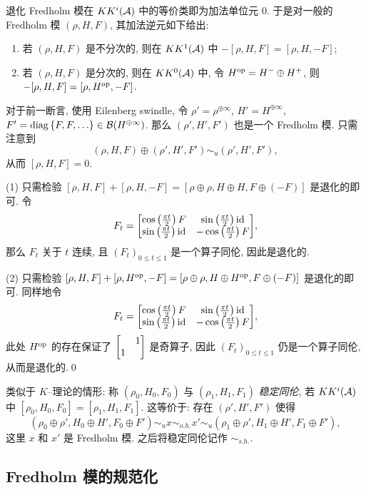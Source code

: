 \begin{Proposition}
	退化 Fredholm 模在 $ KK^i(\mathcal{A}) $ 中的等价类即为加法单位元 $ 0 $. 于是对一般的 Fredholm 模 $ (\rho, H, F) $, 其加法逆元如下给出:
	\begin{enumerate}
		\item 若 $ (\rho, H, F) $ 是不分次的, 则在 $ KK^1(\mathcal{A}) $ 中 $ -[\rho, H, F]=[\rho, H, -F] $;
		\item 若 $ (\rho, H, F) $ 是分次的, 则在 $ KK^0(\mathcal{A}) $ 中, 令 $ H^{\text{op}}=H^-\oplus H^+ $, 则 $ -[\rho, H, F]=[\rho, H^{\text{op}}, -F] $.
	\end{enumerate}
\end{Proposition}
\begin{Proof}
	对于前一断言, 使用 Eilenberg swindle, 令 $ \rho'=\rho^{\oplus\infty} $, $ H'=H^{\oplus\infty} $, $ F'=\diag\set{F,F,\dots}\in\CB(H^{\oplus\infty}) $. 那么 $ (\rho', H', F') $ 也是一个 Fredholm 模. 只需注意到
	\[
		(\rho, H, F)\oplus(\rho', H', F')\sim_u(\rho', H', F'),
	\]
	从而 $ [\rho, H, F]=0 $.

	(1) 只需检验 $ [\rho, H, F]+[\rho, H, -F]=[\rho\oplus\rho, H\oplus H, F\oplus(-F)] $ 是退化的即可. 令
	\[
		F_t=\mqty[\cos\left(\frac{\pi t}{2}\right)F & \sin\left(\frac{\pi t}{2}\right)\id \\ \sin\left(\frac{\pi t}{2}\right)\id & -\cos\left(\frac{\pi t}{2}\right)F],
	\]
	那么 $ F_t $ 关于 $ t $ 连续, 且 $ (F_t)_{0\leqslant t\leqslant 1} $ 是一个算子同伦, 因此是退化的.

	(2) 只需检验 $ [\rho, H, F]+[\rho, H^{\text{op}}, -F]=[\rho\oplus\rho, H\oplus H^{\text{op}}, F\oplus(-F)] $ 是退化的即可. 同样地令
	\[
		F_t=\mqty[\cos\left(\frac{\pi t}{2}\right)F & \sin\left(\frac{\pi t}{2}\right)\id \\ \sin\left(\frac{\pi t}{2}\right)\id & -\cos\left(\frac{\pi t}{2}\right)F],
	\]
	此处 $ H^{\text{op}} $ 的存在保证了 $ \mqty[ & 1 \\ 1 &] $ 是奇算子, 因此 $ (F_t)_{0\leqslant t\leqslant 1} $ 仍是一个算子同伦, 从而是退化的.\qed
\end{Proof}

类似于 $ K $--理论的情形: 称 $ (\rho_0, H_0, F_0) $ 与 $ (\rho_1, H_1, F_1) $ \emph{稳定同伦}, 若 $ KK^i(\mathcal{A}) $ 中 $ [\rho_0, H_0, F_0]=[\rho_1, H_1, F_1] $. 这等价于: 存在 $ (\rho', H', F') $ 使得
\[
	(\rho_0\oplus \rho', H_0\oplus H', F_0\oplus F')\sim_u x\sim_{o.h.}x'\sim_u(\rho_1\oplus \rho', H_1\oplus H', F_1\oplus F'),
\]
这里 $ x $ 和 $ x' $ 是 Fredholm 模. 之后将稳定同伦记作 $ \sim_{s.h.} $.

\subsection{Fredholm 模的规范化}

